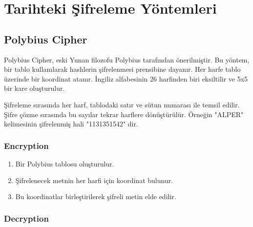 \section{Tarihteki Şifreleme Yöntemleri}

\subsection{Polybius Cipher}

Polybius Cipher, eski Yunan filozofu Polybius tarafından önerilmiştir. Bu yöntem, bir tablo kullanılarak hashlerin şifrelenmesi prensibine dayanır. Her harfe tablo üzerinde bir koordinat atanır. İngiliz alfabesinin 26 harfinden biri eksiltilir ve 5x5 bir kare oluşturulur.

\begin{table}[ht]
\centering
{}
\end{table}

Şifreleme sırasında her harf, tablodaki satır ve sütun numarası ile temsil edilir. Şifre çözme sırasında bu sayılar tekrar harflere dönüştürülür. Örneğin "ALPER" kelimesinin şifrelenmiş hali "1131351542" dir.

\subsubsection{Encryption}

\begin{enumerate}
    \item Bir Polybius tablosu oluşturulur.
    \item Şifrelenecek metnin her harfi için koordinat bulunur.
    \item Bu koordinatlar birleştirilerek şifreli metin elde edilir.
\end{enumerate}

\subsubsection{Decryption}

